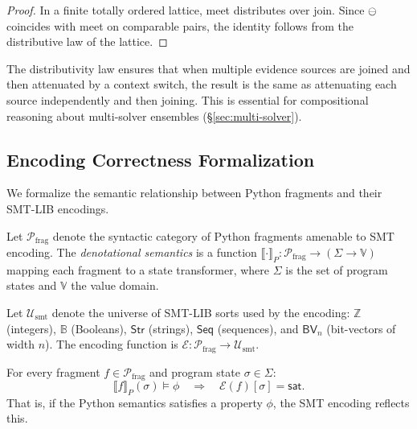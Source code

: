 \documentclass[11pt]{article}
\newcommand{\denot}[1]{\llbracket #1 \rrbracket}
\newcommand{\smtenc}{\mathcal{E}}
\newcommand{\PythonFrag}{\mathcal{P}_{\mathrm{frag}}}
\newcommand{\SmtUni}{\mathcal{U}_{\mathrm{smt}}}
\begin{document}
\begin{proof}
In a finite totally ordered lattice, meet distributes over join.
Since $\ominus$ coincides with meet on comparable pairs, the identity
follows from the distributive law of the lattice.
\end{proof}

\begin{remark}
The distributivity law ensures that when multiple evidence sources
are joined and then attenuated by a context switch, the result is
the same as attenuating each source independently and then joining.
This is essential for compositional reasoning about multi-solver
ensembles (\S\ref{sec:multi-solver}).
\end{remark}

\subsection{Encoding Correctness Formalization}\label{sec:encoding-formal}

We formalize the semantic relationship between Python fragments and their
SMT-LIB encodings.

\begin{definition}\label{def:python-sem}
Let $\PythonFrag$ denote the syntactic category of Python fragments
amenable to SMT encoding.  The \emph{denotational semantics} is a
function $\denot{\cdot}_P : \PythonFrag \to (\Sigma \to \mathbb{V})$
mapping each fragment to a state transformer, where $\Sigma$ is the
set of program states and $\mathbb{V}$ the value domain.
\end{definition}

\begin{definition}\label{def:smt-uni}
Let $\SmtUni$ denote the universe of SMT-LIB sorts used by the
encoding: $\mathbb{Z}$ (integers), $\mathbb{B}$ (Booleans),
$\mathsf{Str}$ (strings), $\mathsf{Seq}$ (sequences), and
$\mathsf{BV}_n$ (bit-vectors of width $n$).  The encoding function
is $\smtenc : \PythonFrag \to \SmtUni$.
\end{definition}

\begin{theorem}\label{thm:encoding-sound}
For every fragment $f \in \PythonFrag$ and program state $\sigma \in
\Sigma$:
\[
  \denot{f}_P(\sigma) \models \phi
  \quad\Longrightarrow\quad
  \smtenc(f)[\sigma] = \mathsf{sat}.
\]
That is, if the Python semantics satisfies a property $\phi$, the SMT
encoding reflects this.
\end{theorem}
\end{document}
